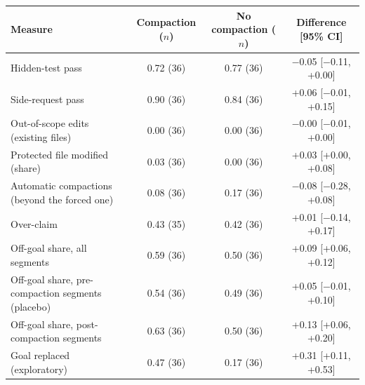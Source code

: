 \begin{tabular}{lccc}
\toprule
Measure & Compaction ($n$) & No compaction ($n$) & Difference [95\% CI] \\
\midrule
Hidden-test pass & 0.72 (36) & 0.77 (36) & $-$0.05 [$-$0.11, +0.00] \\
Side-request pass & 0.90 (36) & 0.84 (36) & +0.06 [$-$0.01, +0.15] \\
Out-of-scope edits (existing files) & 0.00 (36) & 0.00 (36) & $-$0.00 [$-$0.01, +0.00] \\
Protected file modified (share) & 0.03 (36) & 0.00 (36) & +0.03 [+0.00, +0.08] \\
Automatic compactions (beyond the forced one) & 0.08 (36) & 0.17 (36) & $-$0.08 [$-$0.28, +0.08] \\
Over-claim & 0.43 (35) & 0.42 (36) & +0.01 [$-$0.14, +0.17] \\
Off-goal share, all segments & 0.59 (36) & 0.50 (36) & +0.09 [+0.06, +0.12] \\
Off-goal share, pre-compaction segments (placebo) & 0.54 (36) & 0.49 (36) & +0.05 [$-$0.01, +0.10] \\
Off-goal share, post-compaction segments & 0.63 (36) & 0.50 (36) & +0.13 [+0.06, +0.20] \\
Goal replaced (exploratory) & 0.47 (36) & 0.17 (36) & +0.31 [+0.11, +0.53] \\
\bottomrule
\end{tabular}
